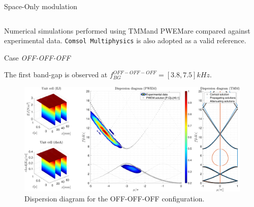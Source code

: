 \begin{frame}{Space-Only modulation}
\begin{columns}[c, onlytextwidth]
\begin{column}{0.45\textwidth}
        \end{column}

    \end{columns}

    \vspace{9pt}

    Numerical simulations performed using TMM\footnotemark[1] and PWEM\footnotemark[2] are compared against experimental data.
    \texttt{Comsol Multiphysics} is also adopted as a valid reference.


\end{frame}



\begin{frame}{Case \textit{OFF-OFF-OFF}}

    The first band-gap is observed at $f_{BG}^{OFF-OFF-OFF} = [3.8, 7.5] kHz$.

    \begin{figure}[H]
        \centering
        \includegraphics[width=\textwidth]{./img/MATLAB/PWEM_TMM_EXP OFF-OFF-OFF @0kHz.pdf}
        \caption{Dispersion diagram for the OFF-OFF-OFF configuration.}
    \end{figure}

\end{frame}



